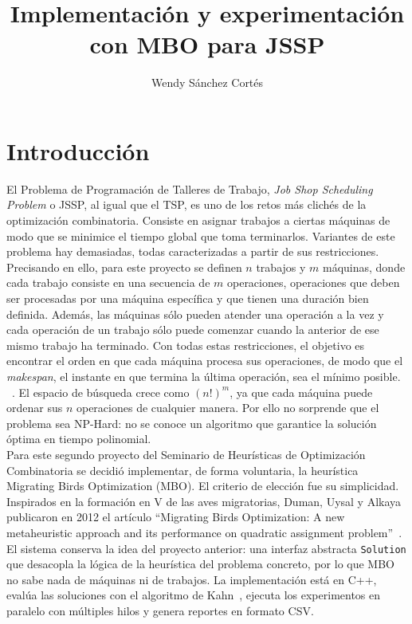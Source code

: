 \documentclass[9pt,a4paper,twocolumn,twoside]{rho-class/rho}
\title{Implementación y experimentación con MBO para JSSP}
\author[{\textasteriskcentered},a]{Wendy Sánchez Cortés}
\affil[a]{Facultad de Ciencias, Universidad Nacional Autónoma de México}
\begin{document}
\maketitle

\section{Introducción}

El Problema de Programación de Talleres de Trabajo, \textit{Job Shop Scheduling Problem} o JSSP, al igual que el TSP,
es uno de los retos más clichés de la optimización combinatoria. Consiste en asignar trabajos a ciertas máquinas de modo que se
minimice el tiempo global que toma terminarlos. Variantes de este problema hay demasiadas, todas caracterizadas a partir de sus
restricciones. Precisando en ello, para este proyecto se definen $n$ trabajos y $m$ máquinas, donde cada trabajo consiste en una
secuencia de $m$ operaciones, operaciones que deben ser procesadas por una máquina específica y que tienen una
duración bien definida. Además, las máquinas sólo pueden atender una operación a la vez y cada operación de un
trabajo sólo puede comenzar cuando la anterior de ese mismo trabajo ha terminado. Con todas
estas restricciones, el objetivo es encontrar el orden en que cada máquina procesa sus operaciones, de modo que el
\textit{makespan}, el instante en que termina la última operación, sea el mínimo posible. ~\cite{garey1976}. El espacio de búsqueda crece
como $(n!)^m$, ya que cada máquina puede ordenar sus $n$ operaciones de cualquier manera. Por ello no sorprende que
el problema sea NP-Hard: no se conoce un algoritmo que garantice la solución óptima en tiempo polinomial. \\

Para este segundo proyecto del Seminario de Heurísticas de Optimización Combinatoria se decidió implementar,
de forma voluntaria, la heurística Migrating Birds Optimization (MBO). El criterio de elección fue su simplicidad.
Inspirados en la formación en V de las aves migratorias, Duman, Uysal y Alkaya publicaron en 2012
el artículo ``Migrating Birds Optimization: A new metaheuristic approach and its performance on quadratic assignment problem''~\cite{duman2012}.\\

El sistema conserva la idea del proyecto anterior: una interfaz abstracta \texttt{Solution} que desacopla la lógica
de la heurística del problema concreto, por lo que MBO no sabe nada de máquinas ni de trabajos. La implementación está
en C++, evalúa las soluciones con el algoritmo de Kahn~\cite{kahn1962}, ejecuta los experimentos en paralelo con múltiples hilos y
genera reportes en formato CSV.
\end{document}
